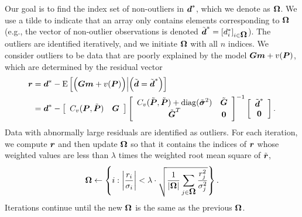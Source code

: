 \documentclass[extra,mreferee]{gji}
\begin{document}
Our goal is to find the index set of non-outliers in $\data^*$, which
we denote as $\mitbf{\Omega}$. We use a tilde to indicate that an
array only contains elements corresponding to $\mitbf{\Omega}$ (e.g.,
the vector of non-outlier observations is denoted $\tilde{\data}^* =
[d_i^*]_{i \in \mitbf{\Omega}}$). The outliers are identified
iteratively, and we initiate $\mitbf{\Omega}$ with all $n$ indices. We
consider outliers to be data that are poorly explained by the model
$\G\mitbf{m} + v(\points)$, which are determined by the residual vector
\begin{align}\label{eq:Residual} 
\mitbf{r} &= \data^* - \E{\Big(\G\mitbf{m} + v(\points)\Big) \Big| \Big(\tilde{\data} =
                                                                        \tilde{\data}^*\Big)} \\
          &= \data^*  - 
            \left[\begin{array}{cc}
                  C_v(\points,\tilde{\points}) & \G \nonumber \\
                  \end{array}\right]
            \left[\begin{array}{cc}
                  C_v(\tilde{\points},\tilde{\points}) + \mathrm{diag}(\tilde{\mitbf{\sigma}}^2) & \tilde{\G} \\
                  \tilde{\G}^T  & \zeros \\
                  \end{array}\right]^{-1}
            \left[\begin{array}{c}
                  \tilde{\data}^* \\
                  \zeros \\
                  \end{array}\right].
\end{align}
Data with abnormally large residuals are identified as outliers. For
each iteration, we compute $\mitbf{r}$ and then update
$\mitbf{\Omega}$ so that it contains the indices of $\mitbf{r}$ whose
weighted values are less than $\lambda$ times the weighted root mean
square of $\tilde{\mitbf{r}}$,
\begin{equation}\label{eq:Update}
\mitbf{\Omega} \leftarrow \left\{i : \left|\frac{r_i}{\sigma_i}\right| < \lambda \cdot \sqrt{\frac{1}{|\mitbf{\Omega}|} \sum_{j \in \mitbf{\Omega}} \frac{r_j^2}{\sigma_j^2}} \right\}.
\end{equation} 
Iterations continue until the new $\mitbf{\Omega}$ is the same as the
previous $\mitbf{\Omega}$.
\end{document}

